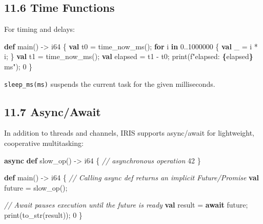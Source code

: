 \documentclass[
  english,
]{book}
\newenvironment{Shaded}{\begin{snugshade}}{\end{snugshade}}
\newcommand{\CommentTok}[1]{\textcolor[rgb]{0.42,0.60,0.33}{\textit{#1}}}
\newcommand{\ControlFlowTok}[1]{\textcolor[rgb]{0.77,0.53,0.75}{\textbf{#1}}}
\newcommand{\DataTypeTok}[1]{\textcolor[rgb]{0.31,0.79,0.69}{#1}}
\newcommand{\DecValTok}[1]{\textcolor[rgb]{0.71,0.81,0.66}{#1}}
\newcommand{\FunctionTok}[1]{\textcolor[rgb]{0.86,0.86,0.67}{#1}}
\newcommand{\KeywordTok}[1]{\textcolor[rgb]{0.34,0.61,0.84}{\textbf{#1}}}
\newcommand{\NormalTok}[1]{\textcolor[rgb]{0.83,0.83,0.83}{#1}}
\newcommand{\OperatorTok}[1]{\textcolor[rgb]{0.83,0.83,0.83}{#1}}
\newcommand{\StringTok}[1]{\textcolor[rgb]{0.81,0.57,0.47}{#1}}
\begin{document}
\subsection{11.6 Time Functions}\label{time-functions}

For timing and delays:

\begin{Shaded}
\begin{Highlighting}[]
\KeywordTok{def}\NormalTok{ main() }\OperatorTok{{-}\textgreater{}} \DataTypeTok{i64}\NormalTok{ \{}
    \KeywordTok{val}\NormalTok{ t0 }\OperatorTok{=}\NormalTok{ time\_now\_ms();}
    \ControlFlowTok{for}\NormalTok{ i }\ControlFlowTok{in} \DecValTok{0}\OperatorTok{..}\DecValTok{1000000}\NormalTok{ \{}
        \KeywordTok{val}\NormalTok{ \_ }\OperatorTok{=}\NormalTok{ i }\OperatorTok{*}\NormalTok{ i;}
\NormalTok{    \}}
    \KeywordTok{val}\NormalTok{ t1 }\OperatorTok{=}\NormalTok{ time\_now\_ms();}
    \KeywordTok{val}\NormalTok{ elapsed }\OperatorTok{=}\NormalTok{ t1 }\OperatorTok{{-}}\NormalTok{ t0;}
    \FunctionTok{print}\NormalTok{(}\StringTok{f"elapsed: }\ControlFlowTok{\{}\NormalTok{elapsed}\ControlFlowTok{\}}\StringTok{ ms"}\NormalTok{);}
    \DecValTok{0}
\NormalTok{\}}
\end{Highlighting}
\end{Shaded}

\texttt{sleep\_ms(ms)} suspends the current task for the given
milliseconds.

\subsection{11.7 Async/Await}\label{asyncawait-1}

In addition to threads and channels, IRIS supports async/await for
lightweight, cooperative multitasking:

\begin{Shaded}
\begin{Highlighting}[]
\KeywordTok{async} \KeywordTok{def}\NormalTok{ slow\_op() }\OperatorTok{{-}\textgreater{}} \DataTypeTok{i64}\NormalTok{ \{}
    \CommentTok{// asynchronous operation}
    \DecValTok{42}
\NormalTok{\}}

\KeywordTok{def}\NormalTok{ main() }\OperatorTok{{-}\textgreater{}} \DataTypeTok{i64}\NormalTok{ \{}
    \CommentTok{// Calling async def returns an implicit Future/Promise}
    \KeywordTok{val}\NormalTok{ future }\OperatorTok{=}\NormalTok{ slow\_op();}
    
    \CommentTok{// Await pauses execution until the future is ready}
    \KeywordTok{val} \DataTypeTok{result} \OperatorTok{=} \KeywordTok{await}\NormalTok{ future;}
    \FunctionTok{print}\NormalTok{(}\FunctionTok{to\_str}\NormalTok{(}\DataTypeTok{result}\NormalTok{));}
    \DecValTok{0}
\NormalTok{\}}
\end{Highlighting}
\end{Shaded}
\end{document}
